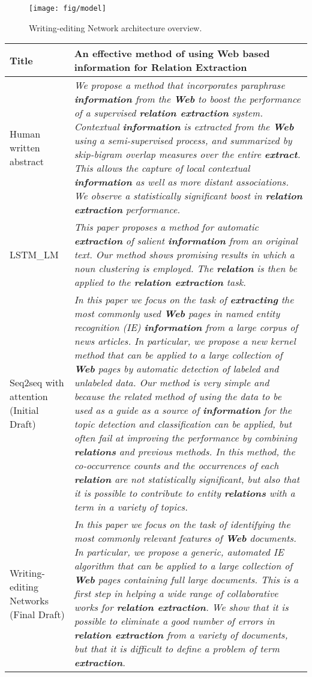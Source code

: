 \documentclass[11pt,a4paper]{article}
\begin{document}
\begin{figure*}[!htb]
\centering\small
\texttt{[image: fig/model]}
\caption{Writing-editing Network architecture overview.}
\label{fig:overview}
\end{figure*}
\begin{table*}[!htb]
\footnotesize\small
\begin{tabular}{|p{1.5cm}|p{13.5cm}|}
\hline 
Title & An effective method of using \textbf{Web} based \textbf{information} for \textbf{Relation Extraction~\cite{Keong2008}}\\
\hline 
Human written abstract&\textit{We propose a method that incorporates paraphrase \textbf{information} from the \textbf{Web} to boost the performance of a supervised \textbf{relation extraction} system. Contextual \textbf{information} is extracted from the \textbf{Web} using a semi-supervised process, and summarized by skip-bigram overlap measures over the entire \textbf{extract}. This allows the capture of local contextual \textbf{information} as well as more distant associations. We observe a statistically significant boost in \textbf{relation extraction} performance.}\\
\hline 
LSTM\_LM &\textit{This paper proposes a method for automatic \textbf{extraction} of salient \textbf{information} from an original text. Our method shows promising results in which a noun clustering is employed. The \textbf{relation} is then be applied to the \textbf{relation extraction} task.}\\
\hline
Seq2seq with attention (Initial Draft) &\textit{In this paper we focus on the task of \textbf{extracting} the most commonly used \textbf{Web} pages in named entity recognition (IE) \textbf{information} from a large corpus of news articles. In particular, we propose a new kernel method that can be applied to a large collection of \textbf{Web} pages by automatic detection of labeled and unlabeled data. Our method is very simple and because the related method of using the data to be used as a guide as a source of \textbf{information} for the topic detection and classification can be applied, but often fail at improving the performance by combining \textbf{relations} and previous methods. In this method, the co-occurrence counts and the occurrences of each \textbf{relation} are not statistically significant, but also that it is possible to contribute to entity \textbf{relations} with a term in a variety of topics.}\\
\hline
Writing-editing Networks (Final Draft)&\textit{In this paper we focus on the task of identifying the most commonly relevant features of \textbf{Web} documents. In particular, we propose a generic, automated IE algorithm that can be applied to a large collection of \textbf{Web} pages containing full large documents. This is a first step in helping a wide range of collaborative works for \textbf{relation extraction}. We show that it is possible to eliminate a good number of errors in \textbf{relation extraction} from a variety of documents, but that it is difficult to define a problem of term \textbf{extraction}.}\\

\end{tabular}
\end{table*}
\end{document}
